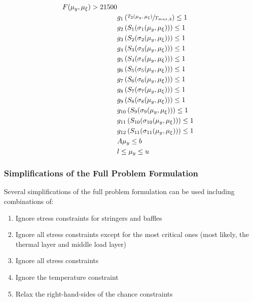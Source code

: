\documentclass{article}
\begin{document}
\begin{multicols}{2}
\begin{equation}
\begin{aligned}
& & F(\mu_y,\mu_{\xi}) > 21500 \\
& & & g_1 \left( \sfrac{T_2(\mu_y,\mu_{\xi})}{T_{max,2}} \right) \leq 1 \\
& & & g_2 \left( S_1 ( \sigma_1(\mu_y,\mu_{\xi}) ) \right) \leq 1 \\
& & & g_3 \left( S_2 ( \sigma_2(\mu_y,\mu_{\xi}) ) \right) \leq 1 \\
& & & g_4 \left( S_3 ( \sigma_3(\mu_y,\mu_{\xi}) ) \right) \leq 1 \\
& & & g_5 \left( S_4 ( \sigma_4(\mu_y,\mu_{\xi}) ) \right) \leq 1 \\
& & & g_6 \left( S_5 ( \sigma_5(\mu_y,\mu_{\xi}) ) \right) \leq 1 \\
& & & g_7 \left( S_6 ( \sigma_6(\mu_y,\mu_{\xi}) ) \right) \leq 1 \\
& & & g_8 \left( S_7 ( \sigma_7(\mu_y,\mu_{\xi}) ) \right) \leq 1 \\
& & & g_9 \left( S_8 ( \sigma_8(\mu_y,\mu_{\xi}) ) \right) \leq 1 \\
& & & g_{10} \left( S_9 ( \sigma_9(\mu_y,\mu_{\xi}) ) \right) \leq 1 \\
& & & g_{11} \left( S_{10} ( \sigma_{10}(\mu_y,\mu_{\xi}) ) \right) \leq 1 \\
& & & g_{12} \left( S_{11} ( \sigma_{11}(\mu_y,\mu_{\xi}) ) \right) \leq 1 \\
& & & A\mu_y \leq b \\
& & & l \leq \mu_y \leq u \\
\end{aligned}
\end{equation}
\end{multicols}

\subsubsection{Simplifications of the Full Problem Formulation}

Several simplifications of the full problem formulation can be used including combinations of:

\begin{enumerate}
\item Ignore stress constraints for stringers and baffles
\item Ignore all stress constraints except for the most critical ones (most likely, the thermal layer and middle load layer)
\item Ignore all stress constraints
\item Ignore the temperature constraint
\item Relax the right-hand-sides of the chance constraints
\end{enumerate}
\end{document}
